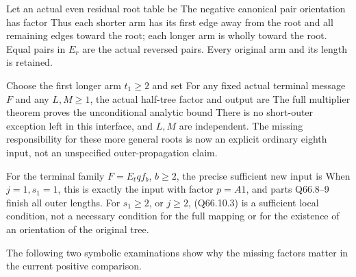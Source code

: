 Let an actual even residual root table be
The negative canonical pair orientation has factor
Thus each shorter arm has its first edge away from the root and all
remaining edges toward the root; each longer arm is wholly toward
the root. Equal pairs in \(E_r\) are the actual reversed pairs.
Every original arm and its length is retained.

Choose the first longer arm \(t_1\ge2\) and set
For any fixed actual terminal message \(F\) and any \(L,\allowbreak  M\ge1\),
the actual half-tree factor and output are
The full multiplier theorem proves the unconditional analytic bound
There is no short-outer exception left in this interface, and
\(L,\allowbreak  M\) are independent. The missing responsibility for these more
general roots is now an explicit ordinary eighth input, not an
unspecified outer-propagation claim.

For the terminal family
\(F=E_tqf_b\), \(b\ge2\), the precise sufficient new input is
When \(j=1,\allowbreak  s_1=1\), this is exactly the input with factor
\(p=A1\), and parts Q66.8--9 finish all outer lengths. For \(s_1\ge2\), or \(j\ge2\), (Q66.10.3) is a sufficient local condition, not a necessary condition for
the full mapping or for the existence of an orientation of the
original tree.

The following two symbolic examinations show why the missing factors matter in the current positive comparison.
